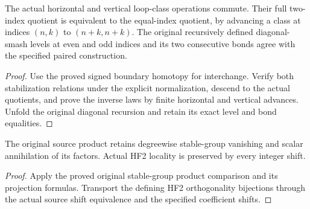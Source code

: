 \begin{proposition}
  \leanok
  The actual horizontal and vertical loop-class operations commute. Their full two-index quotient is equivalent to the equal-index quotient, by advancing a class at indices $(n,k)$ to $(n+k,n+k)$. The original recursively defined diagonal-smash levels at even and odd indices and its two consecutive bonds agree with the specified paired construction.
\end{proposition}
\begin{proof}
  Use the proved signed boundary homotopy for interchange. Verify both stabilization relations under the explicit normalization, descend to the actual quotients, and prove the inverse laws by finite horizontal and vertical advances. Unfold the original diagonal recursion and retain its exact level and bond equalities.
  \leanok
\end{proof}

\begin{proposition}
  \label{prop:actual-product-vanishing-and-shift-locality}
  \leanok
  The original source product retains degreewise stable-group vanishing and scalar annihilation of its factors. Actual HF2 locality is preserved by every integer shift.
\end{proposition}
\begin{proof}
  Apply the proved original stable-group product comparison and its projection formulas. Transport the defining HF2 orthogonality bijections through the actual source shift equivalence and the specified coefficient shifts.
  \leanok
\end{proof}

